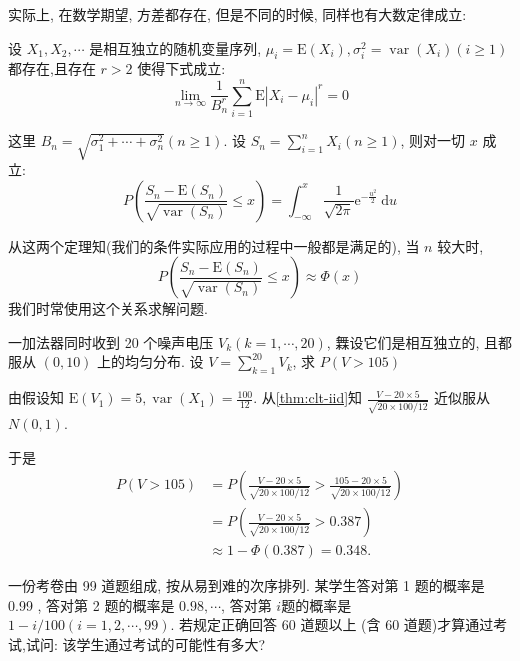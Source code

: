     实际上, 在数学期望, 方差都存在, 但是不同的时候, 同样也有大数定律成立: 

    \begin{theorem}
        \label{thm:clt-gen}
        设 $X_1, X_2, \cdots$ 是相互独立的随机变量序列, $\mu_i=\mathrm{E}\left(X_i\right), \sigma_i^2=\operatorname{var}\left(X_i\right)(i \geqslant 1)$ 都存在,且存在 $r>2$ 使得下式成立:
$$
\lim _{n \rightarrow \infty} \frac{1}{B_n^r} \sum_{i=1}^n \mathrm{E}\left|X_i-\mu_i\right|^r=0
$$

这里 $B_n=\sqrt{\sigma_1^2+\cdots+\sigma_n^2}(n \geqslant 1)$. 设 $S_n=\sum_{i=1}^n X_i(n \geqslant 1)$, 则对一切 $x$ 成立:
$$
P\left(\frac{S_n-\mathrm{E}\left(S_n\right)}{\sqrt{\operatorname{var}\left(S_n\right)}} \leqslant x\right)=\int_{-\infty}^x \frac{1}{\sqrt{2 \pi}} \mathrm{e}^{-\frac{u^2}{2}} \mathrm{~d} u
$$
    \end{theorem}

    从这两个定理知(我们的条件实际应用的过程中一般都是满足的), 当 $n$ 较大时,
$$
P\left(\frac{S_n-\mathrm{E}\left(S_n\right)}{\sqrt{\operatorname{var}\left(S_n\right)}} \leqslant x\right) \approx \Phi(x)
$$
     我们时常使用这个关系求解问题. 

     \begin{example}
        一加法器同时收到 20 个噪声电压 $V_k(k=1, \cdots, 20)$, 橆设它们是相互独立的, 且都服从 $(0,10)$ 上的均匀分布. 设 $V=\sum_{k=1}^{20} V_k$, 求 $P(V>105)$
     \end{example}

     \begin{solution}
        由假设知 $\mathrm{E}\left(V_1\right)=5, \operatorname{var}\left(X_1\right)=\frac{100}{12}$. 从\cref{thm:clt-iid}知 $\frac{V-20 \times 5}{\sqrt{20 \times 100 / 12}}$ 近似服从 $N(0,1)$.

        于是
        $$
        \begin{aligned}
        P(V>105) & =P\left(\frac{V-20 \times 5}{\sqrt{20 \times 100 / 12}}>\frac{105-20 \times 5}{\sqrt{20 \times 100 / 12}}\right) \\
        & =P\left(\frac{V-20 \times 5}{\sqrt{20 \times 100 / 12}}>0.387\right) \\
        & \approx 1-\Phi(0.387)=0.348 .
        \end{aligned}
        $$ 
     \end{solution}


     \begin{example}
        一份考卷由 99 道题组成, 按从易到难的次序排列. 某学生答对第 1 题的概率是 0.99 , 答对第 2 题的概率是 $0.98, \cdots$, 答对第 $i$题的概率是 $1-i / 100(i=1,2, \cdots, 99)$. 若规定正确回答 60 道题以上 (含 60 道题)才算通过考试,试问: 该学生通过考试的可能性有多大?
     \end{example}

